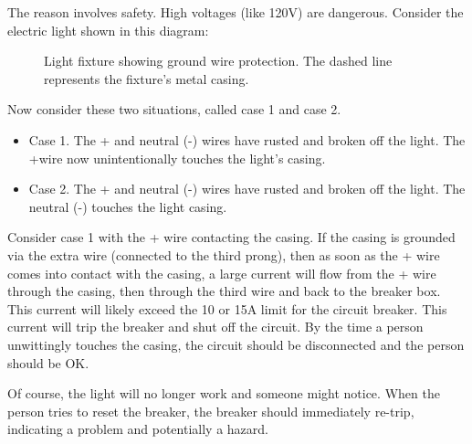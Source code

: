 The reason involves safety. High voltages (like 120V) are dangerous. Consider the electric light shown in this diagram:

\par
\begin{figure}[H]
\begin{center}
\caption{Light fixture showing ground wire protection. The dashed line represents the fixture's metal casing.}
\label{F:23P}
\end{center}
\end{figure}

Now consider these two situations, called case 1 and case 2.\par

\begin{itemize}
\item Case 1. The + and neutral (-) wires have rusted and broken off the light. The +wire now unintentionally touches the light's casing.
\item Case 2. The + and neutral (-) wires have rusted and broken off the light. The neutral (-) touches the light casing.
\end{itemize}

Consider case 1 with the + wire contacting the casing. If the casing is grounded via the extra wire (connected to the third prong), then as soon as the + wire comes into contact with the casing, a large current will flow from the + wire through the casing, then through the third wire and back to the breaker box. This current will likely exceed the 10 or 15A limit for the circuit breaker. This current will trip the breaker and shut off the circuit. By the time a person unwittingly touches the casing, the circuit should be disconnected and the person should be OK.\par

Of course, the light will no longer work and someone might notice. When the person tries to reset the breaker, the breaker should immediately re-trip, indicating a problem and potentially a hazard.\par

